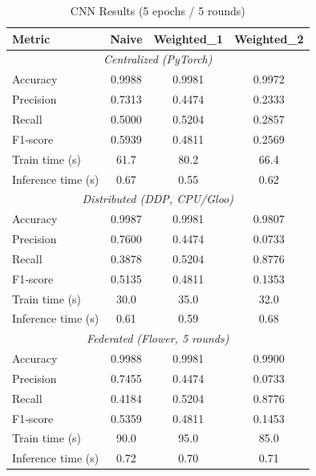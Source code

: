 \documentclass[10pt]{article}
\begin{document}
\begin{table}[H]
  \centering
  \caption{CNN Results (5 epochs / 5 rounds)}
  \label{tab:results_cnn}
  \begin{tabular}{lccc}
    \toprule
    \textbf{Metric}         & \textbf{Naive} & \textbf{Weighted\_1} & \textbf{Weighted\_2} \\
    \midrule
    \multicolumn{4}{c}{\it Centralized (PyTorch)}\\
    \midrule
    Accuracy                & 0.9988 & 0.9981  & 0.9972  \\
    Precision               & 0.7313 & 0.4474  & 0.2333  \\
    Recall                  & 0.5000 & 0.5204  & 0.2857  \\
    F1‐score                & 0.5939 & 0.4811  & 0.2569  \\
    Train time (s)          & 61.7   & 80.2    & 66.4    \\
    Inference time (s)      & 0.67   & 0.55    & 0.62    \\
    \midrule
    \multicolumn{4}{c}{\it Distributed (DDP, CPU/Gloo)}\\
    \midrule
    Accuracy                & 0.9987 & 0.9981  & 0.9807  \\
    Precision               & 0.7600 & 0.4474  & 0.0733  \\
    Recall                  & 0.3878 & 0.5204  & 0.8776  \\
    F1‐score                & 0.5135 & 0.4811  & 0.1353  \\
    Train time (s)          & 30.0   & 35.0    & 32.0    \\
    Inference time (s)      & 0.61   & 0.59    & 0.68    \\
    \midrule
    \multicolumn{4}{c}{\it Federated (Flower, 5 rounds)}\\
    \midrule
    Accuracy                & 0.9988 & 0.9981  & 0.9900  \\
    Precision               & 0.7455 & 0.4474  & 0.0733  \\
    Recall                  & 0.4184 & 0.5204  & 0.8776  \\
    F1‐score                & 0.5359 & 0.4811  & 0.1453  \\
    Train time (s)          & 90.0   & 95.0    & 85.0    \\
    Inference time (s)      & 0.72   & 0.70    & 0.71    \\
    \bottomrule
  \end{tabular}
\end{table}
\end{document}
